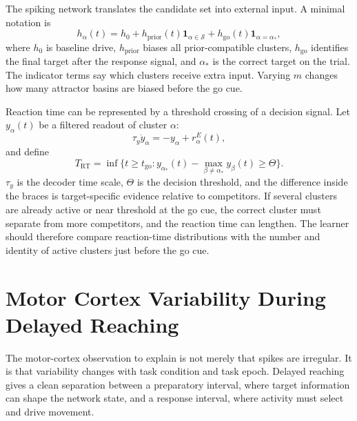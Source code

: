 The spiking network translates the candidate set into external input. A minimal notation is
%
\begin{equation}
  h_{\alpha}(t)
  =
  h_0
  +
  h_{\mathrm{prior}}(t)\mathbf{1}_{\alpha\in\mathcal{S}}
  +
  h_{\mathrm{go}}(t)\mathbf{1}_{\alpha=\alpha_*},
  \label{eq:rostami-task-input}
\end{equation}
%
where $h_0$ is baseline drive, $h_{\mathrm{prior}}$ biases all prior-compatible clusters, $h_{\mathrm{go}}$ identifies the final target after the response signal, and $\alpha_*$ is the correct target on the trial. The indicator terms say which clusters receive extra input. Varying $m$ changes how many attractor basins are biased before the go cue.

Reaction time can be represented by a threshold crossing of a decision signal. Let $y_{\alpha}(t)$ be a filtered readout of cluster $\alpha$:
%
\begin{equation}
  \tau_y\dot y_{\alpha}
  =
  -y_{\alpha}
  +
  r_{\alpha}^{E}(t),
  \label{eq:decision-readout-filter}
\end{equation}
%
and define
%
\begin{equation}
  T_{\mathrm{RT}}
  =
  \inf\{t\ge t_{\mathrm{go}}: y_{\alpha_*}(t)-\max_{\beta\ne\alpha_*}y_{\beta}(t)\ge \Theta\}.
  \label{eq:reaction-time-threshold}
\end{equation}
%
$\tau_y$ is the decoder time scale, $\Theta$ is the decision threshold, and the difference inside the braces is target-specific evidence relative to competitors. If several clusters are already active or near threshold at the go cue, the correct cluster must separate from more competitors, and the reaction time can lengthen. The learner should therefore compare reaction-time distributions with the number and identity of active clusters just before the go cue.

\section{Motor Cortex Variability During Delayed Reaching}
\label{sec:motor-cortex-variability-delayed-reaching}

The motor-cortex observation to explain is not merely that spikes are irregular. It is that variability changes with task condition and task epoch. Delayed reaching gives a clean separation between a preparatory interval, where target information can shape the network state, and a response interval, where activity must select and drive movement.

